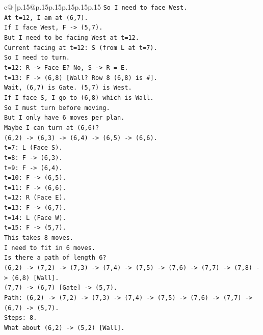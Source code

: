 \documentclass{article}
\begin{document}
{\begin{supertabular}{c@{$\;$}|p{.15\linewidth}@{}p{.15\linewidth}p{.15\linewidth}p{.15\linewidth}p{.15\linewidth}p{.15\linewidth}}
{{{\texttt{So I need to face West.} \\
\texttt{At t=12, I am at (6,7).} \\
\texttt{If I face West, F {-}> (5,7).} \\
\texttt{But I need to be facing West at t=12.} \\
\texttt{Current facing at t=12: S (from L at t=7).} \\
\texttt{So I need to turn.} \\
\texttt{t=12: R {-}> Face E? No, S {-}> R = E.} \\
\texttt{t=13: F {-}> (6,8) {[}Wall? Row 8 (6,8) is \#{]}.} \\
\texttt{Wait, (6,7) is Gate. (5,7) is West.} \\
\texttt{If I face S, I go to (6,8) which is Wall.} \\
\texttt{So I must turn before moving.} \\
\texttt{But I only have 6 moves per plan.} \\
\texttt{Maybe I can turn at (6,6)?} \\
\texttt{(6,2) {-}> (6,3) {-}> (6,4) {-}> (6,5) {-}> (6,6).} \\
\texttt{t=7: L (Face S).} \\
\texttt{t=8: F {-}> (6,3).} \\
\texttt{t=9: F {-}> (6,4).} \\
\texttt{t=10: F {-}> (6,5).} \\
\texttt{t=11: F {-}> (6,6).} \\
\texttt{t=12: R (Face E).} \\
\texttt{t=13: F {-}> (6,7).} \\
\texttt{t=14: L (Face W).} \\
\texttt{t=15: F {-}> (5,7).} \\
\texttt{This takes 8 moves.} \\
\texttt{I need to fit in 6 moves.} \\
\texttt{Is there a path of length 6?} \\
\texttt{(6,2) {-}> (7,2) {-}> (7,3) {-}> (7,4) {-}> (7,5) {-}> (7,6) {-}> (7,7) {-}> (7,8) {-}> (6,8) {[}Wall{]}.} \\
\texttt{(7,7) {-}> (6,7) {[}Gate{]} {-}> (5,7).} \\
\texttt{Path: (6,2) {-}> (7,2) {-}> (7,3) {-}> (7,4) {-}> (7,5) {-}> (7,6) {-}> (7,7) {-}> (6,7) {-}> (5,7).} \\
\texttt{Steps: 8.} \\
\texttt{What about (6,2) {-}> (5,2) {[}Wall{]}.} \\
}}}
\end{supertabular}}
\end{document}
